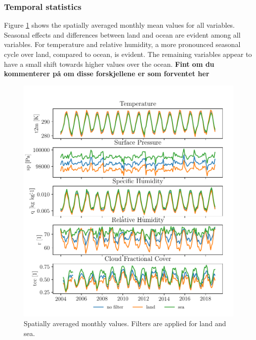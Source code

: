 \subsubsection{Temporal statistics}
Figure \ref{fig:monthly_mean_ts_vars} shows the spatially averaged monthly mean values for all variables. Seasonal effects and differences between land and ocean are evident among all variables. For temperature and relative humidity, a more pronounced seasonal cycle over land, compared to ocean, is evident. The remaining variables appear to have a small shift towards higher values over the ocean. \textbf{Fint om du kommenterer på om disse forskjellene er som forventet her}
\begin{figure}[ht]
    \centering
    \includegraphics{python_figs/monthly_means.pdf}
    \caption{Spatially averaged monthly values. Filters are applied for land and sea.}
    \label{fig:monthly_mean_ts_vars}
\end{figure}

